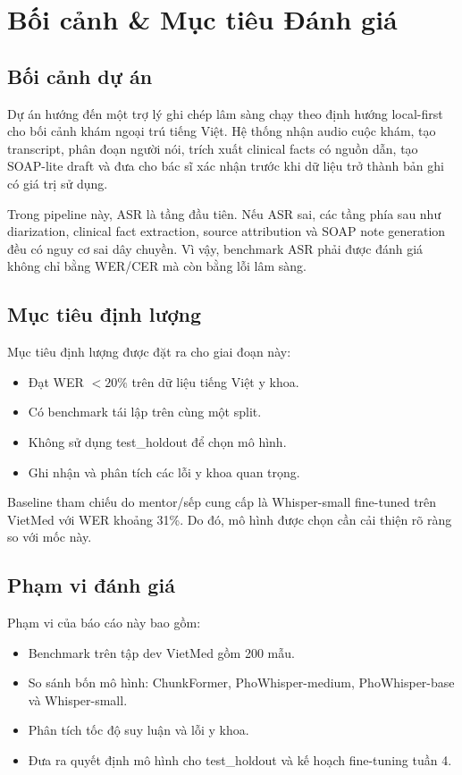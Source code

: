 \documentclass[12pt,a4paper]{article}
\begin{document}
\section{Bối cảnh \& Mục tiêu Đánh giá}

\subsection{Bối cảnh dự án}

Dự án hướng đến một trợ lý ghi chép lâm sàng chạy theo định hướng local-first cho bối cảnh khám ngoại trú tiếng Việt. Hệ thống nhận audio cuộc khám, tạo transcript, phân đoạn người nói, trích xuất clinical facts có nguồn dẫn, tạo SOAP-lite draft và đưa cho bác sĩ xác nhận trước khi dữ liệu trở thành bản ghi có giá trị sử dụng.

Trong pipeline này, ASR là tầng đầu tiên. Nếu ASR sai, các tầng phía sau như diarization, clinical fact extraction, source attribution và SOAP note generation đều có nguy cơ sai dây chuyền. Vì vậy, benchmark ASR phải được đánh giá không chỉ bằng WER/CER mà còn bằng lỗi lâm sàng.

\subsection{Mục tiêu định lượng}

Mục tiêu định lượng được đặt ra cho giai đoạn này:
\begin{itemize}[leftmargin=1.2cm]
    \item Đạt WER $<20\%$ trên dữ liệu tiếng Việt y khoa.
    \item Có benchmark tái lập trên cùng một split.
    \item Không sử dụng test\_holdout để chọn mô hình.
    \item Ghi nhận và phân tích các lỗi y khoa quan trọng.
\end{itemize}

Baseline tham chiếu do mentor/sếp cung cấp là Whisper-small fine-tuned trên VietMed với WER khoảng 31\%. Do đó, mô hình được chọn cần cải thiện rõ ràng so với mốc này.

\subsection{Phạm vi đánh giá}

Phạm vi của báo cáo này bao gồm:
\begin{itemize}[leftmargin=1.2cm]
    \item Benchmark trên tập dev VietMed gồm 200 mẫu.
    \item So sánh bốn mô hình: ChunkFormer, PhoWhisper-medium, PhoWhisper-base và Whisper-small.
    \item Phân tích tốc độ suy luận và lỗi y khoa.
    \item Đưa ra quyết định mô hình cho test\_holdout và kế hoạch fine-tuning tuần 4.
\end{itemize}
\end{document}
